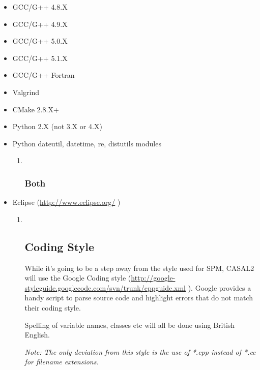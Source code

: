 \documentclass[a4paper,11pt,twoside,pdftex,draft]{article}
\begin{document}
\begin{itemize}
\item
  GCC/G++ 4.8.X
\item
  GCC/G++ 4.9.X
\item
  GCC/G++ 5.0.X
\item
  GCC/G++ 5.1.X
\item
  GCC/G++ Fortran
\item
  Valgrind
\item
  CMake 2.8.X+
\item
  Python 2.X (not 3.X or 4.X)
\item
  Python dateutil, datetime, re, distutils modules

  \begin{enumerate}
  \item ~
    \hypertarget{both}{%
    \subsubsection{Both}\label{both}}
  \end{enumerate}
\end{itemize}

\begin{itemize}
\item
  Eclipse (\href{http://www.eclipse.org/}{{http://www.eclipse.org/}} )

  \begin{enumerate}
  \item ~
    \hypertarget{coding-style}{%
    \subsection{Coding Style}\label{coding-style}}

    While it's going to be a step away from the style used for SPM,
    CASAL2 will use the Google Coding style
    (\href{http://google-styleguide.googlecode.com/svn/trunk/cppguide.xml}{{http://google-styleguide.googlecode.com/svn/trunk/cppguide.xml}}
    ). Google provides a handy script to parse source code and highlight
    errors that do not match their coding style.

    Spelling of variable names, classes etc will all be done using
    British English.

    \emph{Note: The only deviation from this style is the use of *.cpp
    instead of *.cc for filename extensions.}
  \end{enumerate}
\end{itemize}
\end{document}
